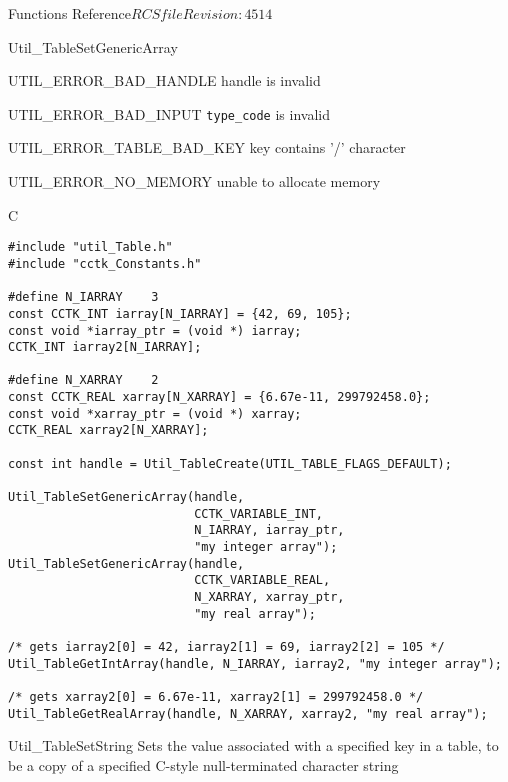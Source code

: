 \begin{cactuspart}{ Functions Reference}{$RCSfile$}{$Revision: 4514 $}
\begin{FunctionDescription}{Util\_TableSetGenericArray}
\begin{ErrorSection}
\begin{Error}{UTIL\_ERROR\_BAD\_HANDLE}
handle is invalid
\end{Error}
\begin{Error}{UTIL\_ERROR\_BAD\_INPUT}
\verb|type_code| is invalid
\end{Error}
\begin{Error}{UTIL\_ERROR\_TABLE\_BAD\_KEY}
key contains '/' character
\end{Error}
\begin{Error}{UTIL\_ERROR\_NO\_MEMORY}
unable to allocate memory
\end{Error}
\end{ErrorSection}

\begin{ExampleSection}
\begin{Example}{C}
\begin{verbatim}
#include "util_Table.h"
#include "cctk_Constants.h"

#define N_IARRAY    3
const CCTK_INT iarray[N_IARRAY] = {42, 69, 105};
const void *iarray_ptr = (void *) iarray;
CCTK_INT iarray2[N_IARRAY];

#define N_XARRAY    2
const CCTK_REAL xarray[N_XARRAY] = {6.67e-11, 299792458.0};
const void *xarray_ptr = (void *) xarray;
CCTK_REAL xarray2[N_XARRAY];

const int handle = Util_TableCreate(UTIL_TABLE_FLAGS_DEFAULT);

Util_TableSetGenericArray(handle,
                          CCTK_VARIABLE_INT,
                          N_IARRAY, iarray_ptr,
                          "my integer array");
Util_TableSetGenericArray(handle,
                          CCTK_VARIABLE_REAL,
                          N_XARRAY, xarray_ptr,
                          "my real array");

/* gets iarray2[0] = 42, iarray2[1] = 69, iarray2[2] = 105 */
Util_TableGetIntArray(handle, N_IARRAY, iarray2, "my integer array");

/* gets xarray2[0] = 6.67e-11, xarray2[1] = 299792458.0 */
Util_TableGetRealArray(handle, N_XARRAY, xarray2, "my real array");
\end{verbatim}
\end{Example}
\end{ExampleSection}
\end{FunctionDescription}


\begin{FunctionDescription}{Util\_TableSetString}
\label{Util-TableSetString}
Sets the value associated with a specified key in a table, to be
a copy of a specified C-style null-terminated character string


\end{FunctionDescription}
\end{cactuspart}
